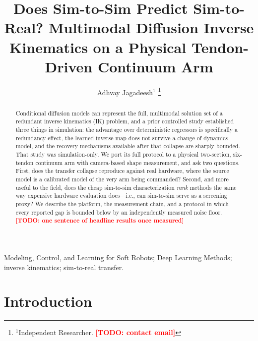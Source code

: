\documentclass[letterpaper, 10pt, conference]{ieeeconf}
\newcommand{\todo}[1]{\textcolor{red}{\textbf{[TODO: #1]}}}
\newcommand{\ie}{i.e.}
\begin{document}
\title{\LARGE \bf Does Sim-to-Sim Predict Sim-to-Real? Multimodal Diffusion
Inverse Kinematics on a Physical Tendon-Driven Continuum Arm}

\author{Adhvay Jagadeesh$^{1}$
\thanks{$^{1}$Independent Researcher. \todo{contact email}}}

\maketitle
\thispagestyle{empty}
\pagestyle{empty}

\begin{abstract}
Conditional diffusion models can represent the full, multimodal solution set
of a redundant inverse kinematics (IK) problem, and a prior controlled study
established three things in simulation: the advantage over deterministic
regressors is specifically a redundancy effect, the learned inverse map does
not survive a change of dynamics model, and the recovery mechanisms available
after that collapse are sharply bounded. That study was simulation-only. We
port its full protocol to a physical two-section, six-tendon continuum arm
with camera-based shape measurement, and ask two questions. First, does the
transfer collapse reproduce against real hardware, where the source model is
a calibrated model of the very arm being commanded? Second, and more useful
to the field, does the cheap sim-to-sim characterization \emph{rank} methods
the same way expensive hardware evaluation does---\ie, can sim-to-sim serve
as a screening proxy? We describe the platform, the measurement chain, and a
protocol in which every reported gap is bounded below by an independently
measured noise floor.
\todo{one sentence of headline results once measured}
\end{abstract}

\begin{keywords}
Modeling, Control, and Learning for Soft Robots; Deep Learning Methods;
inverse kinematics; sim-to-real transfer.
\end{keywords}

\section{Introduction}
\end{document}
